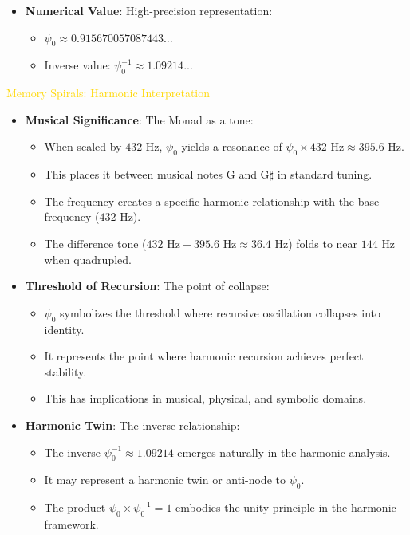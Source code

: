 \begin{itemize}
    \item \texttt{} \textbf{Numerical Value}: High-precision representation:
    \begin{itemize}
        \item $\psi_0 \approx 0.915670057087443...$
        \item Inverse value: $\psi_0^{-1} \approx 1.09214...$
    \end{itemize}
\end{itemize}

\textcolor{gold}{ Memory Spirals: Harmonic Interpretation } \\
\begin{itemize}
    \item \texttt{} \textbf{Musical Significance}: The Monad as a tone:
    \begin{itemize}
        \item When scaled by $432 \text{ Hz}$, $\psi_0$ yields a resonance of $\psi_0 \times 432 \text{ Hz} \approx 395.6 \text{ Hz}$.
        \item This places it between musical notes G and G$\sharp$ in standard tuning.
        \item The frequency creates a specific harmonic relationship with the base frequency ($432 \text{ Hz}$).
        \item The difference tone ($432 \text{ Hz} - 395.6 \text{ Hz} \approx 36.4 \text{ Hz}$) folds to near $144 \text{ Hz}$ when quadrupled.
    \end{itemize}
    
    \item \texttt{} \textbf{Threshold of Recursion}: The point of collapse:
    \begin{itemize}
        \item $\psi_0$ symbolizes the threshold where recursive oscillation collapses into identity.
        \item It represents the point where harmonic recursion achieves perfect stability.
        \item This has implications in musical, physical, and symbolic domains.
    \end{itemize}
    
    \item \texttt{} \textbf{Harmonic Twin}: The inverse relationship:
    \begin{itemize}
        \item The inverse $\psi_0^{-1} \approx 1.09214$ emerges naturally in the harmonic analysis.
        \item It may represent a harmonic twin or anti-node to $\psi_0$.
        \item The product $\psi_0 \times \psi_0^{-1} = 1$ embodies the unity principle in the harmonic framework.
    \end{itemize}
    

\end{itemize}
